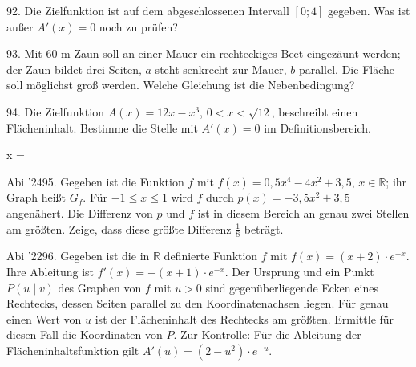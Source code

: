 \documentclass[11pt]{article}
\begin{document}
\begin{pfaufg}{}{92.}{}
Die Zielfunktion ist auf dem abgeschlossenen Intervall $[0; 4]$ gegeben. Was ist außer $A'(x) = 0$ noch zu prüfen?
\end{pfaufg}
\begin{pfaufg}{}{93.}{}
Mit 60 m Zaun soll an einer Mauer ein rechteckiges Beet eingezäunt werden; der Zaun bildet drei Seiten, $a$ steht senkrecht zur Mauer, $b$ parallel. Die Fläche soll möglichst groß werden. Welche Gleichung ist die Nebenbedingung?
\end{pfaufg}
\pfgruppe{}
\begin{pfaufg}{}{94.}{}
Die Zielfunktion $A(x) = 12x - x^3$, $0 < x < \sqrt{12}$, beschreibt einen Flächeninhalt. Bestimme die Stelle mit $A'(x) = 0$ im Definitionsbereich.
\par\noindent x = \leerfeld \par
{}
\end{pfaufg}
\pfgruppe{}
\begin{pfaufg}{Abi ’24}{95.}{}
Gegeben ist die Funktion $f$ mit $f(x) = 0{,}5x^4 - 4x^2 + 3{,}5$, $x \in \mathbb{R}$; ihr Graph heißt $G_f$. Für $-1 \le x \le 1$ wird $f$ durch $p(x) = -3{,}5x^2 + 3{,}5$ angenähert. Die Differenz von $p$ und $f$ ist in diesem Bereich an genau zwei Stellen am größten. Zeige, dass diese größte Differenz $\tfrac{1}{8}$ beträgt.
\end{pfaufg}
\pfgruppe{}
\begin{pfaufg}{Abi ’22}{96.}{}
Gegeben ist die in $\mathbb{R}$ definierte Funktion $f$ mit $f(x) = (x + 2)\cdot e^{-x}$. Ihre Ableitung ist $f'(x) = -(x + 1)\cdot e^{-x}$. Der Ursprung und ein Punkt $P(u \mid v)$ des Graphen von $f$ mit $u > 0$ sind gegenüberliegende Ecken eines Rechtecks, dessen Seiten parallel zu den Koordinatenachsen liegen. Für genau einen Wert von $u$ ist der Flächeninhalt des Rechtecks am größten. Ermittle für diesen Fall die Koordinaten von $P$. Zur Kontrolle: Für die Ableitung der Flächeninhaltsfunktion gilt $A'(u) = (2 - u^2)\cdot e^{-u}$.
\end{pfaufg}
\end{document}
